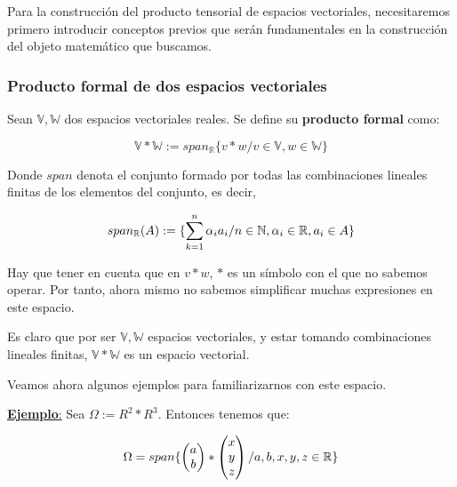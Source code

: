 Para la construcción del producto tensorial de espacios vectoriales, necesitaremos primero introducir conceptos previos que serán fundamentales en la construcción del objeto matemático que buscamos.

\subsubsection{Producto formal de dos espacios vectoriales}

\begin{definicion}
    Sean $\mathbb{V}, \mathbb{W}$ dos espacios vectoriales reales. Se define su \textbf{producto formal} como:

    \begin{equation}
        \mathbb{V} \ast \mathbb{W} := span_{\mathbb{R}} \{v \ast w / v \in \mathbb{V}, w \in \mathbb{W} \}
    \end{equation}

    Donde $span$ denota el conjunto formado por todas las combinaciones lineales finitas de los elementos del conjunto, es decir,

    \begin{equation}
        span_{\mathbb{R}}(A) := \{ \sum_{k = 1}^n \alpha_i a_i / n \in \mathbb{N}, \alpha_i \in \mathbb{R}, a_i \in A \}
    \end{equation}

    Hay que tener en cuenta que en $v \ast w$, $\ast$ es un símbolo con el que no sabemos operar. Por tanto, ahora mismo no sabemos simplificar muchas expresiones en este espacio.
\end{definicion}

Es claro que por ser $\mathbb{V}, \mathbb{W}$ espacios vectoriales, y estar tomando combinaciones lineales finitas, $\mathbb{V} \ast \mathbb{W}$ es un espacio vectorial.

Veamos ahora algunos ejemplos para familiarizarnos con este espacio.

\underline{\textbf{Ejemplo}:} Sea $\Omega := R^2 \ast R^3$. Entonces tenemos que:

\begin{equation}
    \Omega = span \{
        \begin{pmatrix}
            a \\
            b
        \end{pmatrix}
        \ast
        \begin{pmatrix}
            x \\
            y \\
            z
        \end{pmatrix}
        / a, b, x, y, z \in \mathbb{R}
    \}
\end{equation}



